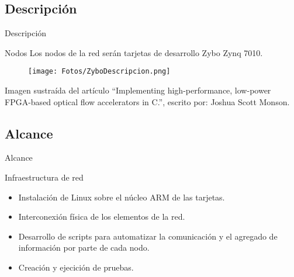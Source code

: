 \documentclass[aspectratio=169]{beamer}
\begin{document}
\subsection{Descripción}
\begin{frame}{Descripción}
\begin{block}{Nodos}
	Los nodos de la red serán tarjetas de desarrollo Zybo Zynq 7010.
\end{block}
\begin{figure}[h]
	\centering
	\texttt{[image: Fotos/ZyboDescripcion.png]}
\end{figure}
\begin{center}
	Imagen sustraída del artículo ``Implementing high-performance, low-power FPGA-based optical flow accelerators in C.'', escrito por: Joshua Scott Monson.
\end{center}
\end{frame}



\subsection{Alcance}
\begin{frame}{Alcance}
\begin{block}{Infraestructura de red}
	\begin{itemize}
		\item Instalación de Linux sobre el núcleo ARM de las tarjetas.
		\item Interconexión física de los elementos de la red.
		\item Desarrollo de scripts para automatizar la comunicación y el agregado de información por parte de cada nodo.
		\item Creación y ejecición de pruebas.
	\end{itemize}
\end{block}
\end{frame}
\end{document}
